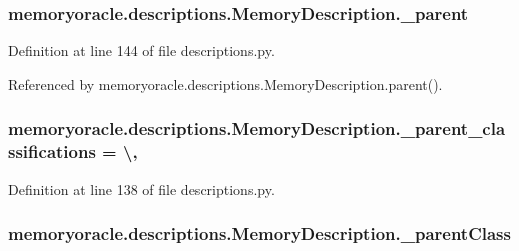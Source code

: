 \subsubsection[{\+\_\+parent}]{\setlength{\rightskip}{0pt plus 5cm}memoryoracle.\+descriptions.\+Memory\+Description.\+\_\+parent\hspace{0.3cm}{\ttfamily [private]}}\label{classmemoryoracle_1_1descriptions_1_1MemoryDescription_a1ac34a11871a96eeff4f8285e0ad3a66}


Definition at line 144 of file descriptions.\+py.



Referenced by memoryoracle.\+descriptions.\+Memory\+Description.\+parent().

\hypertarget{classmemoryoracle_1_1descriptions_1_1MemoryDescription_a9b09a20927902bb9e26d1ce27ad99822}{}
\subsubsection[{\+\_\+parent\+\_\+classifications}]{\setlength{\rightskip}{0pt plus 5cm}memoryoracle.\+descriptions.\+Memory\+Description.\+\_\+parent\+\_\+classifications = \textbackslash{}\hspace{0.3cm}{\ttfamily [static]}, {\ttfamily [private]}}\label{classmemoryoracle_1_1descriptions_1_1MemoryDescription_a9b09a20927902bb9e26d1ce27ad99822}


Definition at line 138 of file descriptions.\+py.

\hypertarget{classmemoryoracle_1_1descriptions_1_1MemoryDescription_a56f034c13ee367338d69fd438b7182bf}{}
\subsubsection[{\+\_\+parent\+Class}]{\setlength{\rightskip}{0pt plus 5cm}memoryoracle.\+descriptions.\+Memory\+Description.\+\_\+parent\+Class\hspace{0.3cm}{\ttfamily [private]}}\label{classmemoryoracle_1_1descriptions_1_1MemoryDescription_a56f034c13ee367338d69fd438b7182bf}


